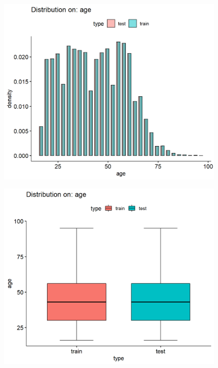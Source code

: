 \documentclass[11pt, letter,twocolumn]{article}
\begin{document}
\begin{figure}[ht]
	\centering
	\label{fig:unnamed-chunk-8-1}
	\includegraphics[width=0.9\linewidth]{imgs/preliminary_analysis/unnamed-chunk-8-1}
\end{figure}
\begin{figure}[ht]
	\centering

	\label{fig:unnamed-chunk-8-2}
	\includegraphics[width=0.9\linewidth]{imgs/preliminary_analysis/unnamed-chunk-8-2}
\end{figure}
\end{document}

